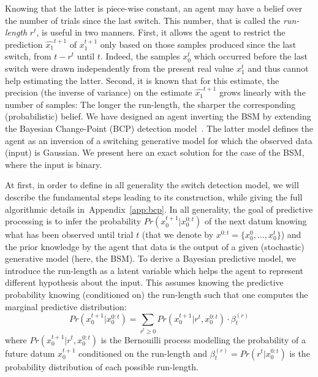 \documentclass[12pt,english]{article}%
\newcommand{\eql}[1]{\begin{equation}#1\end{equation}}
\newcommand{\citep}[1]{\parencite{#1}}
\newcommand{\seeEq}[1]{Equation~\ref{eq:#1}}
\newcommand{\seeApp}[1]{Appendix~\ref{app:#1}}
\begin{document}
Knowing that the latter is piece-wise constant,
an agent may have a belief over the number of trials since the last switch.
This number, that is called the \emph{run-length} $r^t$, is useful in two manners.
First, it allows the agent to restrict the prediction $\hat{x_1}^{t+1}$ of $x_1^{t+1}$
only based on those samples produced since the last switch, from $t-r^t$ until $t$.
Indeed, the samples $x_0^t$ which occurred before the last switch
were drawn independently from the present real value $x_1^t$
and thus cannot help estimating the latter.
Second, it is known that for this estimate, the precision
(the inverse of variance) on the estimate $\hat{x_1}^{t+1}$
grows linearly with the number of samples:
The longer the run-length, the sharper the corresponding (probabilistic) belief.
We have designed an agent inverting the BSM by extending
the Bayesian Change-Point (BCP) detection model~\citep{AdamsMackay2007}.
The latter model defines the agent as an inversion of a switching generative model
for which the observed data (input) is Gaussian.
We present here an exact solution for the case of the BSM, where the input is binary. %

At first, in order to define in all generality the switch detection model,
we will describe the fundamental steps leading to its construction,
while giving the full algorithmic details in~\seeApp{bcp}.
In all generality, the goal of predictive processing
is to infer the probability $Pr(x_0^{t+1} | x_0^{0:t})$ of the next datum
knowing what has been observed until trial $t$
(that we denote by $x^{0:t} = \{ x_0^0, \ldots, x_0^t \}$) and
the prior knowledge by the agent
that data is the output of a given (stochastic) generative model (here, the BSM).
To derive a Bayesian predictive model, we introduce
the run-length as a latent variable which helps the agent to represent
different hypothesis about the input.
%
%
This assumes knowing the predictive probability knowing (conditioned on) the run-length
such that one computes the marginal predictive distribution:
\eql{
Pr(x_0^{t+1} | x_0^{0:t}) =
\sum_{r^{t}\geq 0} Pr(x_0^{t+1} | r^{t}, x_0^{0:t}) \cdot \beta^{(r)}_t
\label{eq:pred}
}
where $Pr(x_0^{t+1} | r^{t}, x_0^{0:t})$ is
the Bernouilli process modelling the probability of a future datum $x_0^{t+1}$
conditioned on the run-length and
$\beta^{(r)}_t=Pr(r^t | x_0^{0:t})$ is the probability distribution of each possible run-length.
\end{document}
